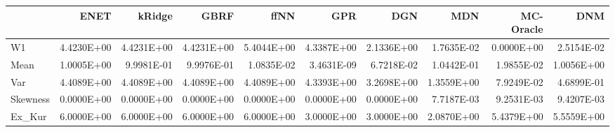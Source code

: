 \begin{tabular}{lrrrrrrrrr}
\toprule
{} &       ENET &     kRidge &       GBRF &       ffNN &        GPR &        DGN &        MDN &  MC-Oracle &        DNM \\
\midrule
W1       & 4.4230E+00 & 4.4231E+00 & 4.4231E+00 & 5.4044E+00 & 4.3387E+00 & 2.1336E+00 & 1.7635E-02 & 0.0000E+00 & 2.5154E-02 \\
Mean     & 1.0005E+00 & 9.9981E-01 & 9.9976E-01 & 1.0835E-02 & 3.4631E-09 & 6.7218E-02 & 1.0442E-01 & 1.9855E-02 & 1.0056E+00 \\
Var      & 4.4089E+00 & 4.4089E+00 & 4.4089E+00 & 4.4089E+00 & 4.3393E+00 & 3.2698E+00 & 1.3559E+00 & 7.9249E-02 & 4.6899E-01 \\
Skewness & 0.0000E+00 & 0.0000E+00 & 0.0000E+00 & 0.0000E+00 & 0.0000E+00 & 0.0000E+00 & 7.7187E-03 & 9.2531E-03 & 9.4207E-03 \\
Ex\_Kur   & 6.0000E+00 & 6.0000E+00 & 6.0000E+00 & 6.0000E+00 & 3.0000E+00 & 3.0000E+00 & 2.0870E+00 & 5.4379E+00 & 5.5559E+00 \\
\bottomrule
\end{tabular}
